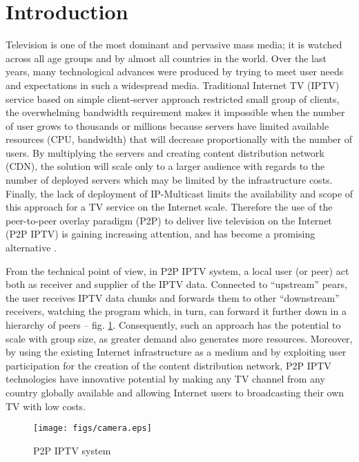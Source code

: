 \documentclass[10pt, conference, compsocconf]{IEEEtran}
\begin{document}
\section{Introduction}
Television is one of the most dominant and pervasive mass media; it is watched across all age groups and by almost all countries in the world. Over the last years, many technological advances were produced by trying to meet user needs and expectations in such a widespread media. Traditional Internet TV (IPTV) service based on simple client-server approach restricted small group of clients, the overwhelming bandwidth requirement makes it impossible when the number of user grows to thousands or millions because servers have limited available resources (CPU, bandwidth) that will decrease proportionally with the number of users. By multiplying the servers and creating content distribution network (CDN), the solution will scale only to a larger audience with regards to the number of deployed servers which may be limited by the infrastructure costs. Finally, the lack of deployment of IP-Multicast limits the availability and scope of this approach for a TV service on the Internet scale. Therefore the use of the peer-to-peer overlay paradigm (P2P) to deliver live television on the Internet (P2P IPTV) is gaining increasing attention, and has become a promising alternative \cite{liu_opportunities_2008}⁠.

From the technical point of view, in P2P IPTV system, a local user (or peer) act both as receiver and supplier of the IPTV data. Connected to “upstream” pears, the user receives IPTV data chunks and forwards them to other “downstream” receivers, watching the program which, in turn, can forward it further down in a hierarchy of peers -- fig. \ref{fig:camera}. Consequently, such an approach has the potential to scale with group size, as greater demand also generates more resources. Moreover, by using the existing Internet infrastructure as a medium and by exploiting user participation for the creation of the content distribution network, P2P IPTV technologies have innovative potential by making any TV channel from any country globally available and allowing Internet users to broadcasting their own TV with low costs.
\begin{figure}[!t]
\centering
\texttt{[image: figs/camera.eps]}
\caption{P2P IPTV system}
\label{fig:camera}
\end{figure}
\end{document}
